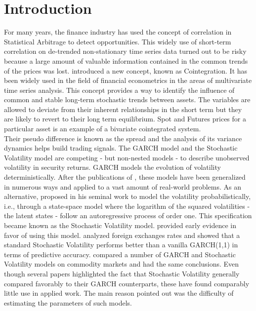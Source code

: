 \documentclass[11pt,a4,twosided,singlespacing,titlepagenumber=on]{scrreprt}
\numberwithin{equation}{chapter} %
\theoremstyle{remark}
\begin{document}
\chapter{Introduction}

For many years, the finance industry has used the concept of correlation in Statistical Arbitrage to detect opportunities. This widely use of short-term correlation on de-trended non-stationary time series data turned out to be risky because a large amount of valuable information contained in the common trends of the prices was lost. \cite{engle1987} introduced a new concept, known as Cointegration. It has been widely used in the field of financial econometrics in the areas of multivariate time series analysis. This concept provides a way to identify the influence of common and stable long-term stochastic trends between assets. The variables are allowed to deviate from their inherent relationships in the short term but they are likely to revert to their long term equilibrium. Spot and Futures prices for a particular asset is an example of a bivariate cointegrated system. \\

Their pseudo difference is known as the spread and the analysis of its variance dynamics helps build trading signals. The GARCH model and the Stochastic Volatility model are competing - but non-nested models - to describe unobserved volatility in security returns. GARCH models the evolution of volatility deterministically. After the publications of \cite{engle1986}, these models have been generalized in numerous ways and applied to a vast amount of real-world problems. As an alternative, \cite{taylor1982} proposed in his seminal work to model the volatility probabilistically, i.e., through a state-space model where the logarithm of the squared volatilities - the latent states - follow an autoregressive process of order one. This specification became known as the Stochastic Volatility model. \cite{kim1998} provided early evidence in favor of using this model. \cite{kastner2014} analyzed foreign exchanges rates and showed that a standard Stochastic Volatility performs better than a vanilla GARCH(1,1) in terms of predictive accuracy. \cite{chan2015} compared a number of GARCH and Stochastic Volatility models on commodity markets and had the same conclusions. Even though several papers highlighted the fact that Stochastic Volatility generally compared favorably to their GARCH counterparts, these have found comparably little use in applied work. The main reason pointed out was the difficulty of estimating the parameters of such models. \\
\end{document}
